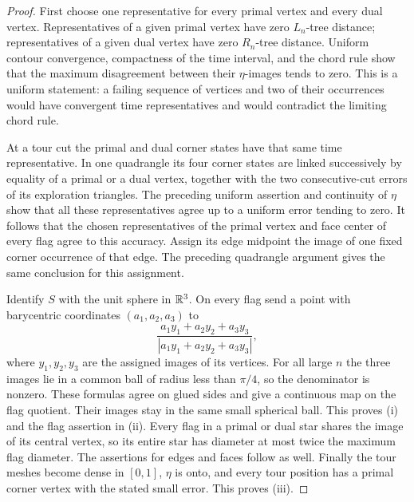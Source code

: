 \begin{proof}
First choose one representative for every primal vertex and every dual
vertex.  Representatives of a given primal vertex have zero
$L_n$-tree distance; representatives of a given dual vertex have zero
$R_n$-tree distance.  Uniform contour convergence, compactness of the
time interval, and the chord rule show that the maximum disagreement
between their $\eta$-images tends to zero.  This is a uniform statement:
a failing sequence of vertices and two of their occurrences would have
convergent time representatives and would contradict the limiting chord
rule.

At a tour cut the primal and dual corner states have that same time
representative.  In one quadrangle its four corner states are linked
successively by equality of a primal or a dual vertex, together with the
two consecutive-cut errors of its exploration triangles.  The preceding
uniform assertion and continuity of $\eta$ show that all these
representatives agree up to a uniform error tending to zero.  It follows
that the chosen representatives of the primal vertex and face center
of every flag agree to this accuracy.  Assign its edge midpoint the
image of one fixed corner occurrence of that edge.  The preceding
quadrangle argument gives the same conclusion for this assignment.

Identify $S$ with the unit sphere in $\mathbb R^3$.  On every flag send a point
with barycentric coordinates $(a_1,a_2,a_3)$ to
\[
 \frac{a_1 y_1+a_2 y_2+a_3 y_3}
 {|a_1 y_1+a_2 y_2+a_3 y_3|},
\]
where $y_1,y_2,y_3$ are the assigned images of its vertices.  For all
large $n$ the three images lie in a common ball of radius less than
$\pi/4$, so the denominator is nonzero.  These formulas agree on glued
sides and give a continuous map on the flag quotient.  Their images
stay in the same small spherical ball.  This proves (i) and the flag
assertion in (ii).  Every flag in a primal or dual star shares the
image of its central vertex, so its entire star has diameter at most
twice the maximum flag diameter.  The assertions for edges and faces
follow as well.  Finally the tour meshes become dense in $[0,1]$,
$\eta$ is onto, and every tour position has a primal corner vertex
with the stated small error.  This proves (iii).
\end{proof}

